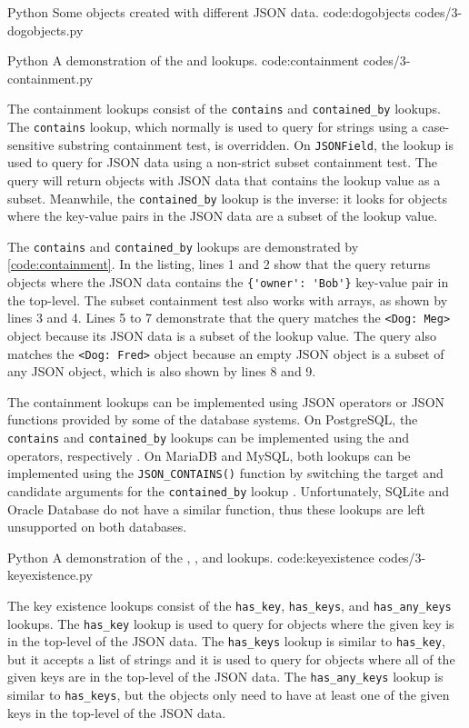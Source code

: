 \listing
{Python}
{Some  objects created with different JSON data.}
{code:dogobjects}
{codes/3-dogobjects.py}

\listing
{Python}
{A demonstration of the  and  lookups.}
{code:containment}
{codes/3-containment.py}

The containment lookups consist of the \verb|contains| and \verb|contained_by|
lookups. The \verb|contains| lookup, which normally is used to query for
strings using a case-sensitive substring containment test, is overridden. On
\verb|JSONField|, the lookup is used to query for JSON data using a non-strict
subset containment test. The query will return objects with JSON data that
contains the lookup value as a subset. Meanwhile, the \verb|contained_by|
lookup is the inverse: it looks for objects where the key-value pairs in the
JSON data are a subset of the lookup value.

The \verb|contains| and \verb|contained_by| lookups are demonstrated by
\autoref{code:containment}. In the listing, lines 1 and 2 show that the query
returns objects where the JSON data contains the \verb|{'owner': 'Bob'}|
key-value pair in the top-level. The subset containment test also works with
arrays, as shown by lines 3 and 4. Lines 5 to 7 demonstrate that the query
matches the \verb|<Dog: Meg>| object because its JSON data is a subset of the
lookup value. The query also matches the \verb|<Dog: Fred>| object because an
empty JSON object is a subset of any JSON object, which is also shown by lines
8 and 9.

The containment lookups can be implemented using JSON operators or JSON
functions provided by some of the database systems. On PostgreSQL, the
\verb|contains| and \verb|contained_by| lookups can be implemented using the
 and  operators, respectively \cite{postgres:json_operators}.
On MariaDB and MySQL, both lookups can be implemented using the
\verb|JSON_CONTAINS()| function by switching the target and candidate arguments
for the \verb|contained_by| lookup \cite{mariadb:json_contains,
mysql:json_search}. Unfortunately, SQLite and Oracle Database do not have a
similar function, thus these lookups are left unsupported on both databases.

\listing
{Python}
{A demonstration of the
, , and  lookups.}
{code:keyexistence}
{codes/3-keyexistence.py}

The key existence lookups consist of the \verb|has_key|, \verb|has_keys|, and
\verb|has_any_keys| lookups. The \verb|has_key| lookup is used to query for
objects where the given key is in the top-level of the JSON data. The
\verb|has_keys| lookup is similar to \verb|has_key|, but it accepts a list of
strings and it is used to query for objects where all of the given keys are
in the top-level of the JSON data. The \verb|has_any_keys| lookup is similar
to \verb|has_keys|, but the objects only need to have at least one of the
given keys in the top-level of the JSON data.

